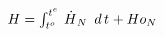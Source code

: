\documentclass[border=1pt]{standalone}
\begin{document}
$H=\int_{ {{t^o}}{_{}} }^{ {{t^e}}{_{}} } \, {{\dot{H}}}{_{N}} \enskip d\,{t}{_{}}  + {Ho}{_{N}}$
\end{document}
